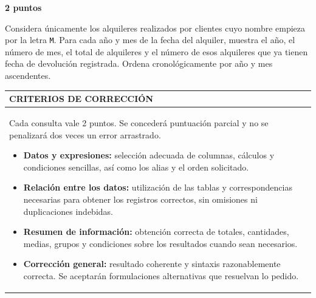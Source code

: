 \documentclass[11pt,a4paper]{article}
\begin{document}
\par\medskip{}\hfill{\color{LBcereza}\bfseries 2 puntos}\par\smallskip
Considera únicamente los alquileres realizados por clientes cuyo nombre empieza por la letra \texttt{M}. Para cada año y mes de la fecha del alquiler, muestra el año, el número de mes, el total de alquileres y el número de esos alquileres que ya tienen fecha de devolución registrada. Ordena cronológicamente por año y mes ascendentes.\par\medskip
\medskip\noindent\begin{tabularx}{\textwidth}{|X|}\hline
\cellcolor{LBgris}\color{LBcian}\bfseries CRITERIOS DE CORRECCIÓN \\ \hline
\begin{minipage}{\dimexpr\linewidth-2\tabcolsep\relax}\vspace{2mm}\small Cada consulta vale 2 puntos. Se concederá puntuación parcial y no se penalizará dos veces un error arrastrado.\par\smallskip \begin{itemize}[leftmargin=4mm,nosep]\item \textbf{Datos y expresiones:} selección adecuada de columnas, cálculos y condiciones sencillas, así como los alias y el orden solicitado.
\item \textbf{Relación entre los datos:} utilización de las tablas y correspondencias necesarias para obtener los registros correctos, sin omisiones ni duplicaciones indebidas.
\item \textbf{Resumen de información:} obtención correcta de totales, cantidades, medias, grupos y condiciones sobre los resultados cuando sean necesarios.
\item \textbf{Corrección general:} resultado coherente y sintaxis razonablemente correcta. Se aceptarán formulaciones alternativas que resuelvan lo pedido.
\end{itemize}\vspace{2mm}\end{minipage} \\ \hline
\end{tabularx}\medskip
\end{document}
